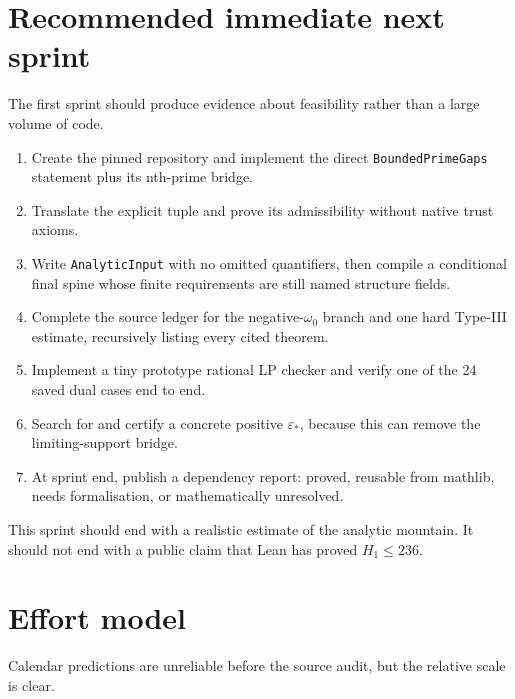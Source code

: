 \documentclass[11pt]{article}
\newcommand{\Hone}{H_1}
\newcommand{\leanname}[1]{\texttt{#1}}
\begin{document}
\section{Recommended immediate next sprint}

The first sprint should produce evidence about feasibility rather than a large
volume of code.

\begin{enumerate}[label=S\arabic*.,leftmargin=3.2em]
\item Create the pinned repository and implement the direct
\leanname{BoundedPrimeGaps} statement plus its nth-prime bridge.
\item Translate the explicit tuple and prove its admissibility without native
trust axioms.
\item Write \leanname{AnalyticInput} with no omitted quantifiers, then compile a
conditional final spine whose finite requirements are still named structure
fields.
\item Complete the source ledger for the negative-\(\omega_0\) branch and one
hard Type-III estimate, recursively listing every cited theorem.
\item Implement a tiny prototype rational LP checker and verify one of the 24
saved dual cases end to end.
\item Search for and certify a concrete positive \(\varepsilon_*\), because
this can remove the limiting-support bridge.
\item At sprint end, publish a dependency report: proved, reusable from
mathlib, needs formalisation, or mathematically unresolved.
\end{enumerate}

This sprint should end with a realistic estimate of the analytic mountain.  It
should not end with a public claim that Lean has proved \(\Hone\leq236\).

\section{Effort model}

Calendar predictions are unreliable before the source audit, but the relative
scale is clear.
\end{document}
